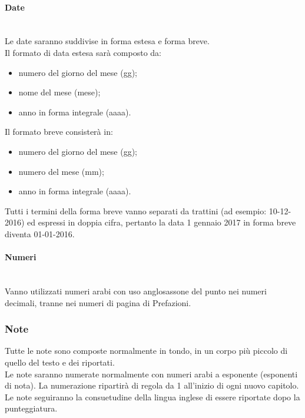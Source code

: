 \paragraph{Date} \mbox{} \\
Le date saranno suddivise in forma estesa e forma breve.\\
Il formato di data estesa sarà composto da:
\begin{itemize}
	\item numero del giorno del mese (gg);
	\item nome del mese (mese);
	\item anno in forma integrale (aaaa).
\end{itemize}
Il formato breve consisterà in:
\begin{itemize}
	\item numero del giorno del mese (gg);
	\item numero del mese (mm);
	\item anno in forma integrale (aaaa).
\end{itemize}
Tutti i termini della forma breve vanno separati da trattini (ad esempio: 10-12-2016) ed espressi in doppia cifra, pertanto la data 1 gennaio 2017 in forma breve diventa 01-01-2016.


\paragraph{Numeri} \mbox{} \\
Vanno utilizzati numeri arabi con uso anglosassone del punto nei numeri decimali, tranne nei numeri di pagina di Prefazioni.

\subsubsection{Note}
Tutte le note sono composte normalmente in tondo, in un corpo più piccolo di quello del testo e dei riportati.\\
Le note saranno numerate normalmente con numeri arabi a esponente (esponenti di nota). La numerazione ripartirà di regola da 1 all'inizio di ogni nuovo capitolo.\\
Le note seguiranno la consuetudine della lingua inglese di essere riportate dopo la punteggiatura.

